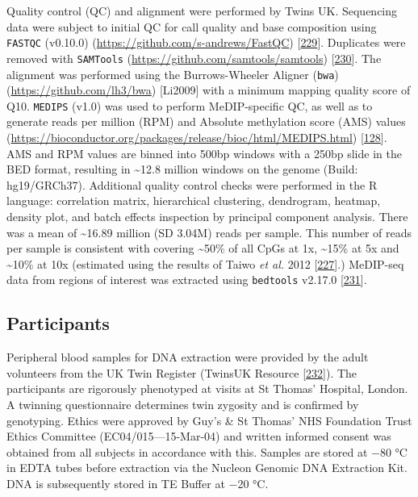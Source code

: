 \documentclass[
]{book}
\begin{document}
Quality control (QC) and alignment were performed by Twins UK.
Sequencing data were subject to initial QC for call quality and base composition using \texttt{FASTQC} (v0.10.0) (\url{https://github.com/s-andrews/FastQC}) {[}\protect\hyperlink{ref-Andrews2010}{229}{]}.
Duplicates were removed with \texttt{SAMTools} (\url{https://github.com/samtools/samtools}) {[}\protect\hyperlink{ref-Li2009b}{230}{]}.
The alignment was performed using the Burrows-Wheeler Aligner (\texttt{bwa}) (\url{https://github.com/lh3/bwa}) {[}Li2009{]} with a minimum mapping quality score of Q10.
\texttt{MEDIPS} (v1.0) was used to perform MeDIP-specific QC, as well as to generate reads per million (RPM) and Absolute methylation score (AMS) values (\url{https://bioconductor.org/packages/release/bioc/html/MEDIPS.html}) {[}\protect\hyperlink{ref-Lienhard2014}{128}{]}.
AMS and RPM values are binned into 500bp windows with a 250bp slide in the BED format, resulting in \textasciitilde12.8 million windows on the genome (Build: hg19/GRCh37).
Additional quality control checks were performed in the R language: correlation matrix, hierarchical clustering, dendrogram, heatmap, density plot, and batch effects inspection by principal component analysis.
There was a mean of \textasciitilde16.89 million (SD 3.04M) reads per sample.
This number of reads per sample is consistent with covering \textasciitilde50\% of all CpGs at 1x, \textasciitilde15\% at 5x and \textasciitilde10\% at 10x (estimated using the results of Taiwo \emph{et al.} 2012 {[}\protect\hyperlink{ref-Taiwo2012}{227}{]}.)
MeDIP-seq data from regions of interest was extracted using \texttt{bedtools} v2.17.0 {[}\protect\hyperlink{ref-Quinlan2010}{231}{]}.

\hypertarget{participants}{%
\subsection{Participants}\label{participants}}

Peripheral blood samples for DNA extraction were provided by the adult volunteers from the UK Twin Register (TwinsUK Resource {[}\protect\hyperlink{ref-Moayyeri2013}{232}{]}).
The participants are rigorously phenotyped at visits at St Thomas' Hospital, London.
A twinning questionnaire determines twin zygosity and is confirmed by genotyping.
Ethics were approved by Guy's \& St Thomas' NHS Foundation Trust Ethics Committee (EC04/015---15-Mar-04) and written informed consent was obtained from all subjects in accordance with this.
Samples are stored at −80 °C in EDTA tubes before extraction via the Nucleon Genomic DNA Extraction Kit.
DNA is subsequently stored in TE Buffer at −20 °C.
\end{document}

